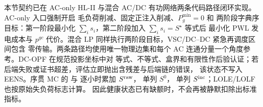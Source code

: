 \begin{theorynote}
本节契约已在 AC-only HL-II 与混合 AC/DC 有功网络两条代码路径闭环实现。AC-only 入口强制开启
毛负荷削减、固定正注入削减、$P_g^{\min}=0$ 和
两阶段字典序目标：第一阶段最小化 $\sum_i s_i$，第二阶段加入 $\sum_i s_i=S^\star$ 等式后
最小化 PWL 发电成本与 $p^{gc}$ 代价。混合 LP 同样执行两阶段目标，VSC/DC--DC 紧急再调度区间包含
零传输。两条路径均使用唯一物理边集和每个 AC 连通分量一个角度参考。DC-OPF 在规范投影坐标中对
等式、不等式、盒界和有限性作后验认证；若后端失败或证书超差，评估立即抛出含残差与后端链的错误，
该状态不写入 EENS。序贯 MC 的  与  逐小时累加
$S^{\rm raw}$， 单列 $S^0$，
 单列 $S^{\rm inc}$；LOLE/LOLF 也按原始失负荷标志计算。
因此健康状态已有缺额时，不会再被静默扣除出标准指标。
\end{theorynote}

